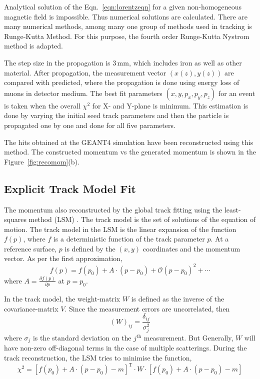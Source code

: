 Analytical solution of the Eqn.~\ref{eqn:lorentzeqn} for a given
non-homogeneous magnetic field is impossible. Thus numerical solutions
are calculated. There are many numerical methods, among many one group of
methods used in tracking is Runge-Kutta Method. For this purpose, the
fourth order Runge-Kutta Nystrom \cite{lund2009track} method is adapted.

The step size in the propagation is 3\,mm, which includes iron as well
as other material. After propagation, the measurement vector
$(x(z),y(z))$ are compared with predicted, where the propagation is done
using energy loss of muons in detector medium. The best fit parameters
$(x,y,p_{x},p_{y},p_{z})$ for an event is taken when the overall
$\chi^{2}$ for X- and Y-plane is minimum. This estimation is done by
varying the initial seed track parameters and then the particle is
propagated one by one and done for all five parameters.    

The hits obtained at the GEANT4 simulation have been reconstructed
using this method. The constructed momentum vs the generated momentum
is shown in the Figure~\ref{fig:recomom}(b).

\subsection{Explicit Track Model Fit}
The momentum also reconstructed by the global track fitting using the
least-squares method (LSM) \cite{explicit1}. The track model is the set
of solutions of the equation of motion. The track model in the LSM is
the linear expansion of the function $f\left(p\right)$, where $f$ is a
deterministic function of the track parameter $p$. At a reference
surface, $p$ is defined by the $\left(x,y\right)$ coordinates and the
momentum vector. As per the first approximation,
\begin{equation}
  f\left(p\right) = f\left(p_{0}\right) + A\cdot \left(p-p_{0}\right) + \mathcal{O} \left(p-p_{0}\right)^{2}+\cdots
\end{equation}
where $A=\frac{\partial f\left(p\right)}{\partial p}$ at $p=p_{0}$.

In the track model, the weight-matrix $W$ is defined as the inverse of
the covariance-matrix $V$. Since the measurement errors are
uncorrelated, then
\begin{equation}
  \left(W\right)_{ij} = \frac{\delta_{ij}}{\sigma_{j}^{2}}
\end{equation}
where $\sigma_{j}$ is the standard deviation on the $j^{\text{th}}$
measurement. But Generally, $W$ will have non-zero off-diagonal terms
in the case of multiple scatterings. During the track reconstruction,
the LSM tries to minimise the function,
\begin{equation}
  \chi^{2} = \left[f\left(p_{0}\right)+ A\cdot \left(p-p_{0}\right) - m\right]^{\mathrm{T}} \cdot W \cdot \left[f\left(p_{0}\right)+ A\cdot \left(p-p_{0}\right) - m\right]
\end{equation}


